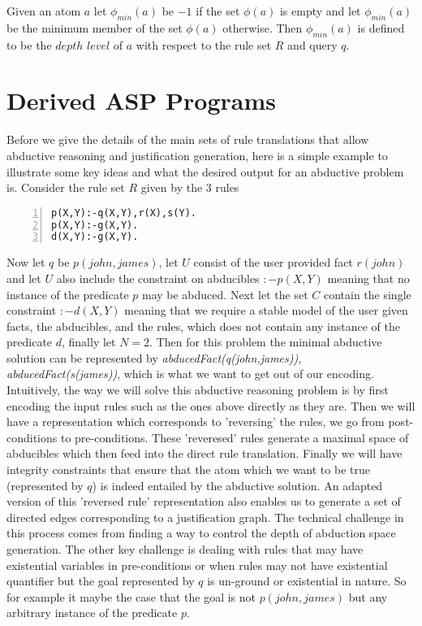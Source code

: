 \documentclass[sigconf]{acmart}
\begin{document}
Given an atom $a$ let $\phi_{min}(a)$ be $-1$ if the set $\phi(a)$ is empty
and let $\phi_{min}(a)$ be the minimum member of the set $\phi(a)$
otherwise. Then $\phi_{min}(a)$ is defined to be the $depth$ $level$ of $a$
with respect to the rule set $R$ and query $q$.

\section{Derived ASP Programs}\label{sec:derived_asp}
Before we give the details of the main sets of rule translations that allow
abductive reasoning and justification generation, here is a simple example to
illustrate some key ideas and what the desired output for an abductive problem
is. Consider the rule set $R$ given by the 3 rules
\begin{lstlisting}[numbers=left,frame=none]
p(X,Y):-q(X,Y),r(X),s(Y).
p(X,Y):-g(X,Y).
d(X,Y):-g(X,Y).
\end{lstlisting}
Now let $q$ be $p(john,james)$, let $U$ consist of the user provided fact
$r(john)$ and let $U$ also include the constraint on abducibles $:-p(X,Y)$
meaning that no instance of the predicate $p$ may be abduced. Next let the set
$C$ contain the single constraint $:-d(X,Y)$ meaning that we require a stable
model of the user given facts, the abducibles, and the rules, which does not
contain any instance of the predicate $d$, finally let $N = 2$. Then for this
problem the minimal abductive solution can be represented by
\textit{abducedFact(q(john,james)), abducedFact(s(james))}, which is what we
want to get out of our encoding. Intuitively, the way we will solve this
abductive reasoning problem is by first encoding the input rules such as the
ones above directly as they are. Then we will have a representation which
corresponds to 'reversing' the rules, \ie we go from post-conditions to
pre-conditions. These 'reveresed' rules
generate a maximal space of abducibles which then feed into the direct rule
translation. Finally we will have integrity constraints that ensure that the
atom which we want to be true (represented by $q$) is indeed entailed by the
abductive solution. An adapted version of this 'reversed rule' representation
also enables us to generate a set of directed edges corresponding to a
justification graph. The technical challenge in this process comes from
finding a way to control the depth of abduction space generation. The other
key challenge is dealing with rules that may have existential variables in
pre-conditions or when rules may not have existential quantifier but the goal
represented by $q$ is un-ground or existential in nature. So for example it
maybe the case that the goal is not $p(john,james)$ but any arbitrary instance
of the predicate $p$.
\end{document}
